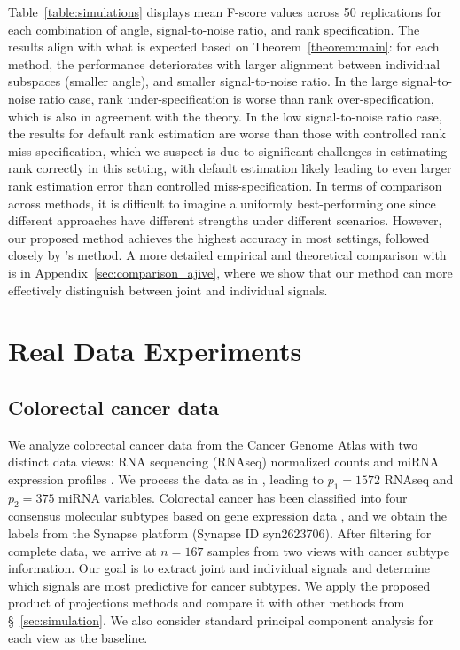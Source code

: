 \documentclass{amsart}
\begin{document}
Table~\ref{table:simulations} displays mean F-score values across 50 replications for each combination of angle, signal-to-noise ratio, and rank specification. The results align with what is expected based on Theorem~\ref{theorem:main}: for each method, the performance deteriorates with larger alignment between individual subspaces (smaller angle), and smaller signal-to-noise ratio. In the large signal-to-noise ratio case, rank under-specification is worse than rank over-specification, which is also in agreement with the theory.  In the low signal-to-noise ratio case, the results for default rank estimation are worse than those with controlled rank miss-specification, which we suspect is due to significant challenges in estimating rank correctly in this setting, with default estimation likely leading to even larger rank estimation error than controlled miss-specification. In terms of comparison across methods, it is difficult to imagine a uniformly best-performing one since different approaches have different strengths under different scenarios. However, our proposed method achieves the highest accuracy in most settings, followed closely by \citet{feng2018angle}'s method. A more detailed empirical and theoretical comparison with \citet{feng2018angle} is in Appendix~\ref{sec:comparison_ajive}, where we show that our method can more effectively distinguish between joint and individual signals.


\section{Real Data Experiments}\label{sec:data}

\subsection{Colorectal cancer data}
\label{sec:colorectal}


We analyze colorectal cancer data from the Cancer Genome Atlas with two distinct data views: RNA sequencing (RNAseq) normalized counts and miRNA expression profiles \citep{guinney2015consensus}. We process the data as in \citet{zhang2022joint}, leading to $p_1 = 1572$ RNAseq and $p_2 = 375$ miRNA variables. Colorectal cancer has been classified into four consensus molecular subtypes based on gene expression data \citep{guinney2015consensus}, and we obtain the labels from the Synapse platform (Synapse ID syn2623706). After filtering for complete data, we arrive at $n = 167$ samples from two views with cancer subtype information. Our goal is to extract joint and individual signals and determine which signals are most predictive for cancer subtypes. We apply the proposed product of projections methods and compare it with other methods from \S~\ref{sec:simulation}. We also consider standard principal component analysis for each view as the baseline.
\end{document}
